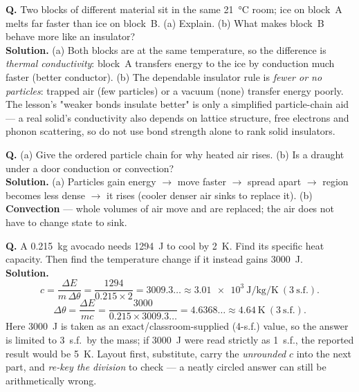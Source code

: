 \documentclass[11pt,a4paper]{article}
\newcommand{\dtheta}{\Delta\theta}
\newcommand{\dE}{\Delta E}
\begin{document}
\begin{keybox}
\textbf{Q.} Two blocks of different material sit in the same \SI{21}{\celsius} room; ice on
block~A melts far faster than ice on block~B. (a) Explain. (b) What makes block~B behave
more like an insulator? \\
\textbf{Solution.} (a) Both blocks are at the same temperature, so the difference is
\emph{thermal conductivity}: block~A transfers energy to the ice by conduction much faster
(better conductor). (b) The dependable insulator rule is \emph{fewer or no particles}:
trapped air (few particles) or a vacuum (none) transfer energy poorly. The lesson's
"weaker bonds insulate better" is only a simplified particle-chain aid --- a real solid's
conductivity also depends on lattice structure, free electrons and phonon scattering, so do
not use bond strength alone to rank solid insulators.
\end{keybox}

\begin{keybox}
\textbf{Q.} (a) Give the ordered particle chain for why heated air rises. (b) Is a draught
under a door conduction or convection? \\
\textbf{Solution.} (a) Particles gain energy $\to$ move faster $\to$ spread apart $\to$
region becomes less dense $\to$ it rises (cooler denser air sinks to replace it). (b)
\textbf{Convection} --- whole volumes of air move and are replaced; the air does not have
to change state to sink.
\end{keybox}

\begin{keybox}
\textbf{Q.} A \SI{0.215}{\kilogram} avocado needs \SI{1294}{\joule} to cool by
\SI{2}{\kelvin}. Find its specific heat capacity. Then find the temperature change if it
instead gains \SI{3000}{\joule}. \\
\textbf{Solution.}
\[
c = \frac{\dE}{m\,\dtheta} = \frac{1294}{0.215\times 2} = 3009.3\ldots
  \approx \SI{3.01e3}{\joule\per\kilogram\per\kelvin}\ (3~\text{s.f.}).
\]
\[
\dtheta = \frac{\dE}{mc} = \frac{3000}{0.215\times 3009.3\ldots} = 4.6368\ldots
  \approx \SI{4.64}{\kelvin}\ (3~\text{s.f.}).
\]
Here \SI{3000}{\joule} is taken as an exact/classroom-supplied (4-s.f.) value, so the answer
is limited to 3~s.f.\ by the mass; if \SI{3000}{\joule} were read strictly as 1~s.f., the
reported result would be \SI{5}{\kelvin}. Layout first, substitute, carry the
\emph{unrounded} $c$ into the next part, and \emph{re-key the division} to check --- a neatly
circled answer can still be arithmetically wrong.
\end{keybox}
\end{document}
